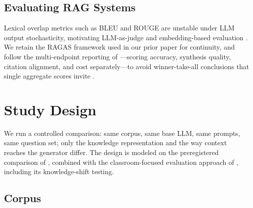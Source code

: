 \documentclass[letterpaper]{article} %
\begin{document}
\subsection{Evaluating RAG Systems}

Lexical overlap metrics such as BLEU and ROUGE are unstable under LLM output stochasticity, motivating LLM-as-judge and embedding-based evaluation \citep{lyu2024crudrag}. We retain the RAGAS framework \citep{ragas2023} used in our prior paper for continuity, and follow the multi-endpoint reporting of \citet{cochran2026vector}---scoring accuracy, synthesis quality, citation alignment, and cost separately---to avoid winner-take-all conclusions that single aggregate scores invite \citep{lyu2024crudrag}.

\section{Study Design}

We run a controlled comparison: same corpus, same base LLM, same prompts, same question set; only the knowledge representation and the way context reaches the generator differ. The design is modeled on the preregistered comparison of \citet{cochran2026vector}, combined with the classroom-focused evaluation approach of \citet{jain2025aligning}, including its knowledge-shift testing.

\subsection{Corpus}
\end{document}

